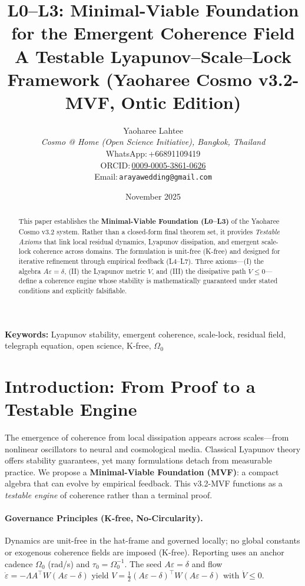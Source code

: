 \documentclass[12pt,a4paper]{article}
\title{\Large\bfseries
L0--L3: Minimal-Viable Foundation for the Emergent Coherence Field\\[2pt]
\large A Testable Lyapunov--Scale--Lock Framework (Yaoharee Cosmo v3.2-MVF, Ontic Edition)}
\author{
Yaoharee Lahtee\\
\textit{Cosmo @ Home (Open Science Initiative), Bangkok, Thailand}\\
WhatsApp:\,+66891109419\\
ORCID:\,\href{https://orcid.org/0009-0005-3861-0626}{0009-0005-3861-0626}\\
Email:\,\texttt{arayawedding@gmail.com}
}
\date{November 2025}
\begin{document}
\maketitle

\begin{abstract}
\noindent
This paper establishes the \textbf{Minimal-Viable Foundation (L0--L3)} of the Yaoharee Cosmo v3.2 system.
Rather than a closed-form final theorem set, it provides \emph{Testable Axioms} that link local residual dynamics,
Lyapunov dissipation, and emergent scale-lock coherence across domains.
The formulation is unit-free (K-free) and designed for iterative refinement through empirical feedback (L4--L7).
Three axioms---(I) the algebra \(A\varepsilon=\delta\), (II) the Lyapunov metric \(V\),
and (III) the dissipative path \(\dot V\le0\)---define a coherence engine whose stability is mathematically guaranteed under stated conditions and explicitly falsifiable.
\end{abstract}

\noindent\textbf{Keywords:}
Lyapunov stability, emergent coherence, scale-lock, residual field, telegraph equation, open science, K-free, \(\Omega_0\)

\section{Introduction: From Proof to a Testable Engine}
\label{sec:intro}
The emergence of coherence from local dissipation appears across scales---from nonlinear oscillators to neural and cosmological media.
Classical Lyapunov theory offers stability guarantees, yet many formulations detach from measurable practice.
We propose a \textbf{Minimal-Viable Foundation (MVF)}: a compact algebra that can evolve by empirical feedback.
This v3.2-MVF functions as a \emph{testable engine} of coherence rather than a terminal proof.

\paragraph{Governance Principles (K-free, No-Circularity).}
Dynamics are unit-free in the hat-frame and governed locally; no global constants or exogenous coherence fields are imposed (K-free).
Reporting uses an anchor cadence \(\Omega_0\) (rad/s) and \(\tau_0=\Omega_0^{-1}\).
The seed \(A\varepsilon=\delta\) and flow \(\dot{\varepsilon}=-\Lambda A^\top W (A\varepsilon-\delta)\) yield
\(V=\frac12(A\varepsilon-\delta)^\top W (A\varepsilon-\delta)\) with \(\dot V\le0\).
\end{document}
